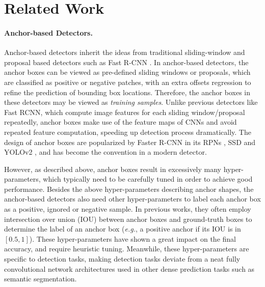 \documentclass[10pt,twocolumn,letterpaper]{article}
\newcommand{\1}{{\mathbbm{1}}}           %
\def\eg{{\it e.g.}\xspace}
\begin{document}
\section{Related Work}
\paragraph{Anchor-based Detectors.} Anchor-based detectors inherit the ideas from traditional sliding-window  and 
%
proposal based detectors such as Fast R-CNN \cite{girshick2015fast}.
In anchor-based detectors, the anchor boxes can be viewed as pre-defined sliding windows or proposals, which are classified as positive or negative patches, with an extra offsets regression to refine the prediction of bounding box locations. Therefore, the anchor boxes in these detectors may be viewed as \emph{training samples}. Unlike previous detectors like Fast RCNN, which compute image features for each sliding window/proposal repeatedly, 
anchor boxes  make use of the feature maps of CNNs and avoid 
repeated feature computation, speeding up detection process dramatically. The design of anchor boxes are popularized by Faster R-CNN in its RPNs \cite{ren2015faster}, SSD
\cite{liu2016ssd} and YOLOv2 \cite{redmon2017yolo9000},
and has become the %
convention 
in a modern detector.







However, as described above, anchor boxes result in excessively  many hyper-parameters, which typically 
need to be carefully tuned   in order to achieve good performance. Besides the above hyper-parameters describing anchor shapes, the anchor-based detectors also need other hyper-parameters to label each anchor box as a positive, ignored or negative sample.
In previous works, they often employ intersection over union (IOU) between anchor boxes and ground-truth boxes to determine the label of an anchor box (\eg, a positive anchor if its IOU is in $[0.5, 1]$). These hyper-parameters have shown a great impact on the final accuracy, and require heuristic tuning. Meanwhile, these hyper-parameters are specific to detection tasks, making detection tasks deviate from a neat fully convolutional network architectures used in other dense prediction tasks such as semantic segmentation.
\end{document}
